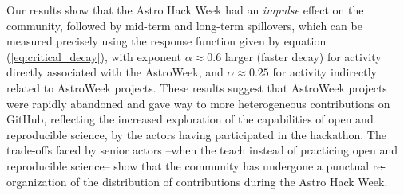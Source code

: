 Our results show that the Astro Hack Week had an {\it impulse} effect on the community, followed by mid-term and long-term spillovers, which can be measured precisely using the response function given by equation (\ref{eq:critical_decay}), with exponent $\alpha \approx 0.6$ larger (faster decay) for activity directly associated with the AstroWeek, and $\alpha \approx 0.25$ for activity indirectly related to AstroWeek projects. These results suggest that AstroWeek projects were rapidly abandoned and gave way to more heterogeneous contributions on GitHub, reflecting the increased exploration of the capabilities of open and reproducible science, by the actors having participated in the hackathon. The trade-offs faced by senior actors --when the teach instead of practicing open and reproducible science-- show that the community has undergone a punctual re-organization of the distribution of contributions during the Astro Hack Week.





